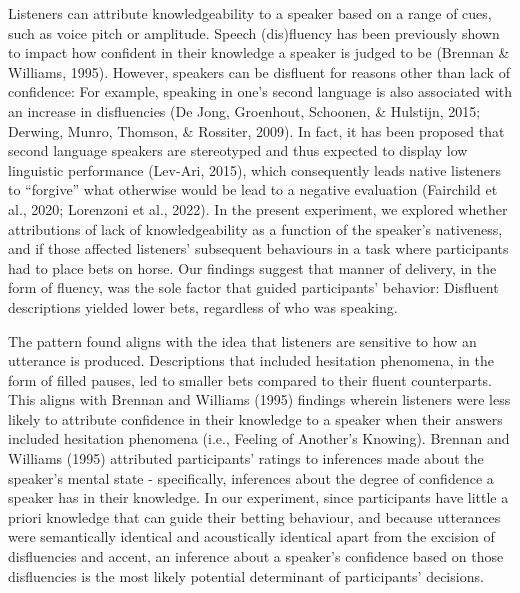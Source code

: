 \documentclass[
  man,floatsintext]{apa7}
\begin{document}
Listeners can attribute knowledgeability to a speaker based on a range of cues, such as voice pitch or amplitude. Speech (dis)fluency has been previously shown to impact how confident in their knowledge a speaker is judged to be (Brennan \& Williams, 1995). However, speakers can be disfluent for reasons other than lack of confidence: For example, speaking in one's second language is also associated with an increase in disfluencies (De Jong, Groenhout, Schoonen, \& Hulstijn, 2015; Derwing, Munro, Thomson, \& Rossiter, 2009). In fact, it has been proposed that second language speakers are stereotyped and thus expected to display low linguistic performance (Lev-Ari, 2015), which consequently leads native listeners to ``forgive'' what otherwise would be lead to a negative evaluation (Fairchild et al., 2020; Lorenzoni et al., 2022). In the present experiment, we explored whether attributions of lack of knowledgeability as a function of the speaker's nativeness, and if those affected listeners' subsequent behaviours in a task where participants had to place bets on horse. Our findings suggest that manner of delivery, in the form of fluency, was the sole factor that guided participants' behavior: Disfluent descriptions yielded lower bets, regardless of who was speaking.

The pattern found aligns with the idea that listeners are sensitive to how an utterance is produced. Descriptions that included hesitation phenomena, in the form of filled pauses, led to smaller bets compared to their fluent counterparts. This aligns with Brennan and Williams (1995) findings wherein listeners were less likely to attribute confidence in their knowledge to a speaker when their answers included hesitation phenomena (i.e., Feeling of Another's Knowing). Brennan and Williams (1995) attributed participants' ratings to inferences made about the speaker's mental state - specifically, inferences about the degree of confidence a speaker has in their knowledge. In our experiment, since participants have little a priori knowledge that can guide their betting behaviour, and because utterances were semantically identical and acoustically identical apart from the excision of disfluencies and accent, an inference about a speaker's confidence based on those disfluencies is the most likely potential determinant of participants' decisions.
\end{document}
